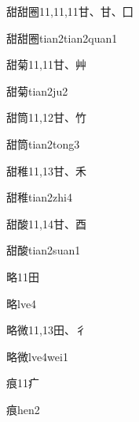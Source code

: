 \begin{Entry}{甜甜圈}{11,11,11}{⽢、⽢、⼞}
  \begin{Phonetics}{甜甜圈}{tian2tian2quan1}
  \end{Phonetics}
\end{Entry}

\begin{Entry}{甜菊}{11,11}{⽢、⾋}
  \begin{Phonetics}{甜菊}{tian2ju2}
  \end{Phonetics}
\end{Entry}

\begin{Entry}{甜筒}{11,12}{⽢、⽵}
  \begin{Phonetics}{甜筒}{tian2tong3}
  \end{Phonetics}
\end{Entry}

\begin{Entry}{甜稚}{11,13}{⽢、⽲}
  \begin{Phonetics}{甜稚}{tian2zhi4}
  \end{Phonetics}
\end{Entry}

\begin{Entry}{甜酸}{11,14}{⽢、⾣}
  \begin{Phonetics}{甜酸}{tian2suan1}
  \end{Phonetics}
\end{Entry}

\begin{Entry}{略}{11}{⽥}
  \begin{Phonetics}{略}{lve4}
  \end{Phonetics}
\end{Entry}

\begin{Entry}{略微}{11,13}{⽥、⼻}
  \begin{Phonetics}{略微}{lve4wei1}
  \end{Phonetics}
\end{Entry}

\begin{Entry}{痕}{11}{⽧}
  \begin{Phonetics}{痕}{hen2}
  \end{Phonetics}
\end{Entry}

